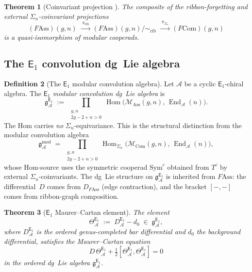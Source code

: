\documentclass[11pt,reqno]{amsart}
\newtheorem{theorem}{Theorem}[section]
\theoremstyle{definition}
\newtheorem{definition}[theorem]{Definition}
\theoremstyle{remark}
\newcommand{\cA}{\mathcal{A}}
\newcommand{\cM}{\mathcal{M}}
\newcommand{\Eone}{\mathsf{E}_{1}}
\newcommand{\Sym}{\mathrm{Sym}}
\newcommand{\Ass}{\mathrm{Ass}}
\newcommand{\Com}{\mathrm{Com}}
\DeclareMathOperator{\Hom}{Hom}
\DeclareMathOperator{\End}{End}
\newcommand{\gmod}{\mathfrak{g}^{\mathrm{mod}}_{\cA}}
\newcommand{\gEone}{\mathfrak{g}^{\Eone}_{\cA}}
\newcommand{\FMAss}{F\!\Ass}
\numberwithin{equation}{section}
\begin{document}
\begin{theorem}[Coinvariant projection {\cite[Thm.~4.9]{GK98}}]
\label{thm:fass-to-fcom}
The composite of the ribbon-forgetting and external
$\Sigma_n$-coinvariant projections
\[
  (\FMAss)(g,n)
  \;\xrightarrow{\;\pi_{\mathrm{rib}}\;}
  (\FMAss)(g,n)/{\sim_{\mathrm{rib}}}
  \;\xrightarrow{\;\pi_{\Sigma_n}\;}
  (F\!\Com)(g,n)
\]
is a quasi-isomorphism of modular cooperads.
\end{theorem}

\subsection{The $\Eone$ convolution dg~Lie algebra}

\begin{definition}[The $\Eone$ modular convolution algebra]
\label{def:e1-convolution}
Let $\cA$ be a cyclic $\Eone$-chiral algebra. The
\emph{$\Eone$ modular convolution dg~Lie algebra} is
\begin{equation}\label{eq:e1-conv-def}
  \gEone
  \;:=\;
  \prod_{\substack{g,n \\ 2g-2+n > 0}}
  \Hom\!\bigl(
    \cM_\Ass(g,n),\,
    \End_\cA(n)
  \bigr).
\end{equation}
The Hom carries \emph{no} $\Sigma_n$-equivariance. This is the
structural distinction from the modular convolution algebra
\begin{equation}\label{eq:mod-conv}
  \gmod
  \;=\;
  \prod_{\substack{g,n \\ 2g-2+n > 0}}
  \Hom_{\Sigma_n}\!\bigl(
    \cM_\Com(g,n),\,
    \End_\cA(n)
  \bigr),
\end{equation}
whose Hom-source uses the symmetric cooperad $\Sym^c$ obtained
from $T^c$ by external $\Sigma_n$-coinvariants.
The dg~Lie structure on $\gEone$ is inherited from $\FMAss$:
the differential~$D$ comes from $D_{\FMAss}$ (edge contraction),
and the bracket $[-,-]$ comes from ribbon-graph composition.
\end{definition}

\begin{theorem}[$\Eone$ Maurer--Cartan element]
\label{thm:e1-mc}
The element
\begin{equation}\label{eq:theta-e1}
  \Theta^{\Eone}_\cA
  \;:=\;
  D^{\Eone}_\cA - d_0
  \;\in\; \gEone,
\end{equation}
where $D^{\Eone}_\cA$ is the ordered genus-completed bar
differential and $d_0$ the background differential, satisfies
the Maurer--Cartan equation
\begin{equation}\label{eq:e1-mc-equation}
  D\,\Theta^{\Eone}_\cA
  + \tfrac{1}{2}[\Theta^{\Eone}_\cA,
    \Theta^{\Eone}_\cA] = 0
\end{equation}
in the ordered dg~Lie algebra $\gEone$.
\end{theorem}
\end{document}
